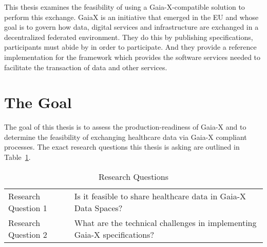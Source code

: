 This thesis examines the feasibility of using a Gaia-X-compatible solution to perform this exchange.
Gaia\-X is an initiative that emerged in the EU and whose goal is to govern how data, digital services and infrastructure are exchanged in a decentralized federated environment.
They do this by publishing specifications, participants must abide by in order to participate.
And they provide a reference implementation for the framework which provides the software services needed to facilitate the transaction of data and other services.

\section{The Goal}\label{sec:the-goal}

The goal of this thesis is to assess the production-readiness of Gaia-X and to determine the feasibility of exchanging healthcare data via Gaia-X compliant processes.
The exact research questions this thesis is asking are outlined in Table~\ref{tab:research-questions}.

\begin{table}
    \centering
    \begin{tabular}{ l|l }
        Research Question 1 & Is it feasible to share healthcare data in Gaia-X Data Spaces?\\
        \hhline{--}
        Research Question 2 & What are the technical challenges in implementing Gaia-X specifications?
    \end{tabular}
    \caption{Research Questions}
    \label{tab:research-questions}
\end{table}
